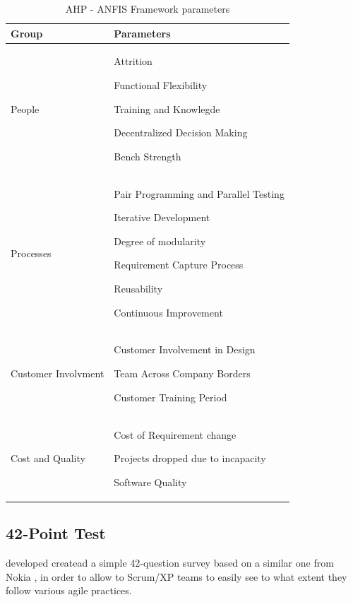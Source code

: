 \begin{table}
\begin{tabular}{| p{3cm} | p{12cm}|}
    \hline
     \textbf{Group} & \textbf{Parameters} \\ \hline
     People  &  \begin{inparaenum} [a\upshape)] \item Attrition \item Functional Flexibility \item Training and Knowlegde \item Decentralized Decision Making \item Bench Strength \end{inparaenum} \\ \hline
     Processes  & \begin{inparaenum} [a\upshape)] \item Pair Programming and Parallel Testing \item Iterative Development \item Degree of modularity \item Requirement Capture Process \item Reusability \item Continuous Improvement
     \end{inparaenum} \\ \hline
    Customer Involvment & \begin{inparaenum} [a\upshape)] \item Customer Involvement in Design \item Team Across Company Borders \item Customer Training Period \end{inparaenum} \\ \hline
     Cost and Quality  & \begin{inparaenum} [a\upshape)] \item Cost of Requirement change \item Projects dropped due to incapacity \item Software Quality \end{inparaenum} \\ \hline
  \end{tabular}
\caption{AHP - ANFIS Framework parameters}
\label{anfis_framework}
\end{table}

\subsection{42-Point Test}
\citet{42points} developed createad a simple 42-question survey based on a similar one from Nokia \cite{nokia}, in order to allow to Scrum/XP teams to easily see to what extent they follow various agile practices.


